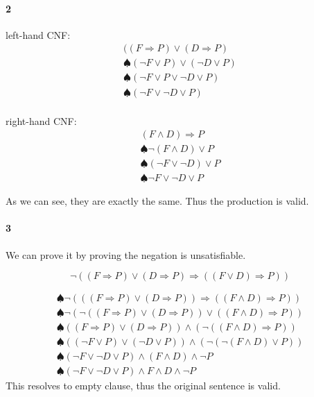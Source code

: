 \paragraph{2}
left-hand CNF:
\begin{eqnarray}
  ((F \Rightarrow P) \vee (D \Rightarrow P)\\
  \spadesuit (\neg F \vee P) \vee (\neg D \vee P)\\
  \spadesuit (\neg F \vee P \vee \neg D \vee P)\\
  \spadesuit (\neg F \vee \neg D \vee P)\\
\end{eqnarray}

right-hand CNF:
\begin{eqnarray}
  (F \wedge D) \Rightarrow P\\
  \spadesuit \neg (F \wedge D) \vee P\\
  \spadesuit (\neg F \vee \neg D) \vee P\\
  \spadesuit \neg F \vee \neg D \vee P
\end{eqnarray}

As we can see, they are exactly the same. Thus the production is valid.

\paragraph{3}
We can prove it by proving the negation is unsatisfiable.

$$\neg ((F \Rightarrow P) \vee (D \Rightarrow P) \Rightarrow ((F \vee D) \Rightarrow P))$$

\begin{eqnarray}
  \spadesuit \neg (((F \Rightarrow P) \vee (D \Rightarrow P)) \Rightarrow ((F \wedge D) \Rightarrow P))\\
  \spadesuit \neg ( \neg ((F \Rightarrow P) \vee (D \Rightarrow P)) \vee ((F \wedge D) \Rightarrow P))\\
  \spadesuit ((F \Rightarrow P) \vee (D \Rightarrow P)) \wedge (\neg ((F \wedge D) \Rightarrow P))\\
  \spadesuit ((\neg F \vee P) \vee (\neg D \vee P)) \wedge (\neg (\neg (F \wedge D) \vee P))\\
  \spadesuit (\neg F \vee \neg D \vee P) \wedge (F \wedge D) \wedge \neg P\\
  \spadesuit (\neg F \vee \neg D \vee P) \wedge F \wedge D \wedge \neg P
\end{eqnarray}
This resolves to empty clause, thus the original sentence is valid.



